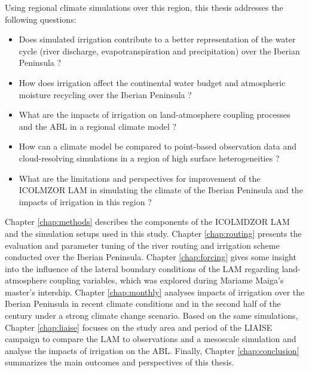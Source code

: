 \hfill

Using regional climate simulations over this region, this thesis addresses the following questions:

\begin{itemize}
    \item Does simulated irrigation contribute to a better representation of the water cycle (river discharge, evapotranspiration and precipitation) over the Iberian Peninsula ?
    \item How does irrigation affect the continental water budget and atmospheric moisture recycling over the Iberian Peninsula ?
    \item What are the impacts of irrigation on land-atmosphere coupling processes and the ABL in a regional climate model ?
    \item How can a climate model be compared to point-based observation data and cloud-resolving simulations in a region of high surface heterogeneities ?
    \item What are the limitations and perspectives for improvement of the ICOLMZOR LAM in simulating the climate of the Iberian Peninsula and the impacts of irrigation in this region ? 
\end{itemize}

Chapter \ref{chap:methods} describes the components of the ICOLMDZOR LAM and the simulation setups used in this study. 
Chapter \ref{chap:routing} presents the evaluation and parameter tuning of the river routing and irrigation scheme conducted over the Iberian Peninsula.
Chapter \ref{chap:forcing} gives some insight into the influence of the lateral boundary conditions of the LAM regarding land-atmosphere coupling variables, which was explored during Mariame Maiga's master's intership. 
Chapter \ref{chap:monthly} analyses impacts of irrigation over the Iberian Peninsula in recent climate conditions and in the second half of the century under a strong climate change scenario. 
Based on the same simulations, Chapter \ref{chap:liaise} focuses on the study area and period of the LIAISE campaign to compare the LAM to observations and a mesoscale simulation and analyse the impacts of irrigation on the ABL.
Finally, Chapter \ref{chap:conclusion} summarizes the main outcomes and perspectives of this thesis.


